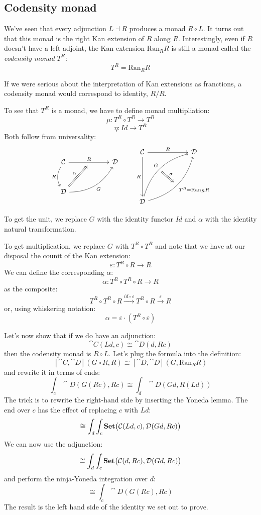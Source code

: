 \documentclass[DaoFP]{subfiles}
\begin{document}
 \subsection{Codensity monad}
 
 We've seen that every adjunction $L \dashv R$ produces a monad $R \circ L$. It turns out that this monad is the right Kan extension of $R$ along $R$. Interestingly, even if $R$ doesn't have a left adjoint, the Kan extension $\text{Ran}_R R$ is still a monad called the \emph{codensity monad} $T^R$:
 \[ T^R = \text{Ran}_R R \]
 
If we were serious about the interpretation of Kan extensions as franctions, a codensity monad would correspond to identity, $R/R$.

To see that $T^R$ is a monad, we have to define monad multipliation:
\[ \mu \colon T^R \circ T^R \to  T^R \]
\[ \eta \colon Id \to T^R \]
 Both follow from universality:
\[
 \begin{tikzcd} [row sep=1cm, column sep=1cm]
 \cat C
 \arrow[rr, "R", "" {name=ID, below} ]
 \arrow[d, bend right, "R"']
 && \cat D
 \\
 \cat D
  \arrow[urr, bend right, "G"']
 \arrow[Rightarrow, "\alpha",  to=ID]
 \end{tikzcd}
 \qquad
\begin{tikzcd}[row sep=2cm, column sep=2cm]
\cat C  \ar[d, "R"', "" {name=P}]
            \ar[r, "R", ""  {name=F, below, near start, bend right}]
&
\cat D
\\
\cat D
    \ar[ur, bend left, "G", "" {name=G, below}]
    \ar[ur, bend right, "T^R = \text{Ran}_R R"', "" {name=Ran}]
\arrow[Rightarrow, "\sigma", from=G, to=Ran]
\end{tikzcd}
\]

To get the unit, we replace $G$ with the identity functor $Id$ and $\alpha$ with the identity natural transformation. 

To get multiplication, we replace $G$ with $T^R \circ T^R$ and note that we have at our disposal the counit of the Kan extension:
\[ \varepsilon \colon  T^R \circ R \to R \]
We can define the corresponding $\alpha$:
\[ \alpha \colon T^R \circ T^R \circ R \to R \]
as the composite:
\[ T^R \circ T^R \circ R \xrightarrow{id \circ \varepsilon} T^R \circ R \xrightarrow{\varepsilon} R\]
or, using whiskering notation:
\[ \alpha = \varepsilon \cdot (T^R \circ \varepsilon) \]


Let's now show that if we do have an adjunction:
\[ \cat C(L d, c) \cong \cat D (d, R c) \]
then the codensity monad is $R \circ L$.
Let's plug the formula into the definition:
\[ [\cat C, \cat D](G \circ R, R) \cong  [\cat D, \cat D] (G, \text{Ran}_R R)\]
and rewrite it in terms of ends:
\[ \int_c \cat D( G (R c), R c) \cong \int_d \cat D (G d, R (L d)) \]
The trick is to rewrite the right-hand side by inserting the Yoneda lemma. The end over $c$ has the effect of replacing $c$ with $L d$:
\[ \cong \int_d \int_c \mathbf{Set}\big(\mathcal{C}(L d, c), \mathcal{D} (G d, R c)\big) \]
We can now use the adjunction:
\[ \cong \int_d \int_c \mathbf{Set}\big(\mathcal{C}(d, R c), \mathcal{D} (G d, R c)\big) \]
and perform the ninja-Yoneda integration over $d$:
\[ \cong \int_c \cat D (G (R c), R c) \]
The result is the left hand side of the identity we set out to prove.
\end{document}

